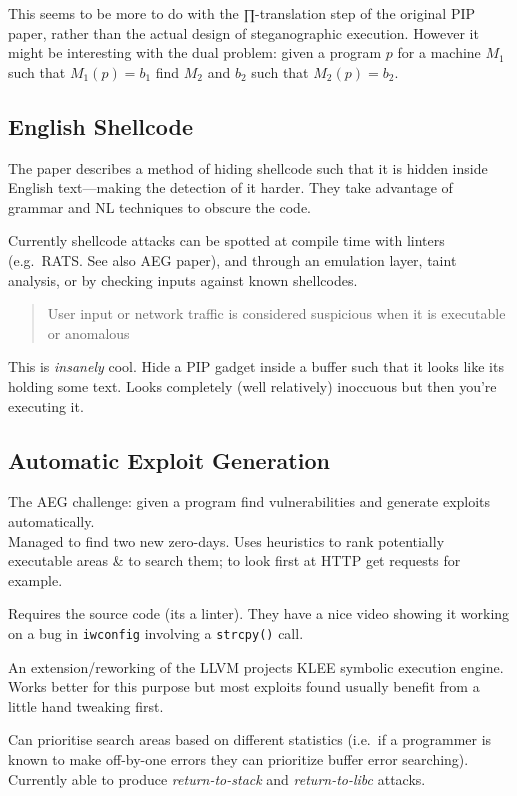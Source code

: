 This seems to be more to do with the ∏-translation step of the original
PIP paper, rather than the actual design of steganographic execution.
However it might be interesting with the dual problem: given a program
$p$ for a machine $M_1$ such that $M_1(p) = b_1$ find $M_2$ and $b_2$
such that $M_2(p) = b_2$.

\subsection{English Shellcode}

The paper describes a method of hiding shellcode such that it is hidden
inside English text---making the detection of it harder. They take
advantage of grammar and NL techniques to obscure the code.

Currently shellcode attacks can be spotted at compile time with linters
(e.g.~RATS. See also AEG paper), and through an emulation layer, taint
analysis, or by checking inputs against known shellcodes.

\begin{quote}
User input or network traffic is considered suspicious when it is
executable or anomalous

\end{quote}
This is \emph{insanely} cool. Hide a PIP gadget inside a buffer such
that it looks like its holding some text. Looks completely (well
relatively) inoccuous but then you're executing it.

\subsection{Automatic Exploit Generation}

The AEG challenge: given a program find vulnerabilities and generate
exploits automatically.\\Managed to find two new zero-days. Uses
heuristics to rank potentially executable areas \& to search them; to
look first at HTTP get requests for example.

Requires the source code (its a linter). They have a nice video showing
it working on a bug in \texttt{iwconfig} involving a \texttt{strcpy()}
call.

An extension/reworking of the LLVM projects KLEE symbolic execution
engine. Works better for this purpose but most exploits found usually
benefit from a little hand tweaking first.

Can prioritise search areas based on different statistics (i.e.~if a
programmer is known to make off-by-one errors they can prioritize buffer
error searching). Currently able to produce \emph{return-to-stack} and
\emph{return-to-libc} attacks.

